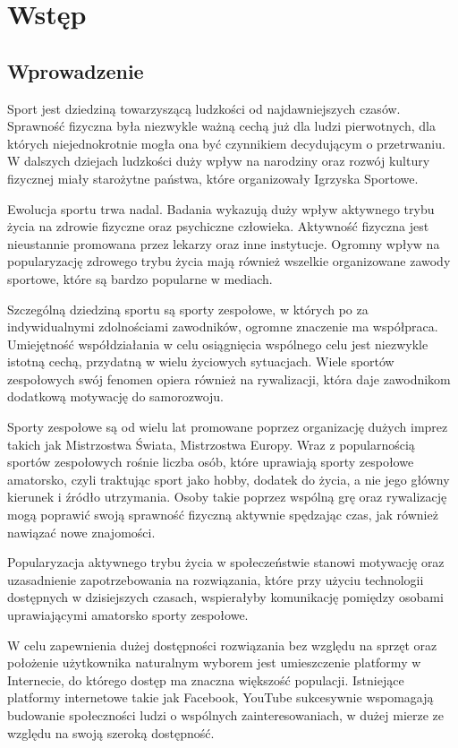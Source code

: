 \chapter{Wstęp}
\section{Wprowadzenie}

Sport jest dziedziną towarzyszącą ludzkości od najdawniejszych czasów. Sprawność fizyczna była niezwykle ważną cechą już dla ludzi pierwotnych, dla których niejednokrotnie mogła ona być czynnikiem decydującym o przetrwaniu. W dalszych dziejach ludzkości duży wpływ na narodziny oraz rozwój kultury fizycznej miały starożytne państwa, które organizowały Igrzyska Sportowe.

Ewolucja sportu trwa nadal. Badania wykazują duży wpływ aktywnego trybu życia na zdrowie fizyczne oraz psychiczne człowieka. Aktywność fizyczna jest nieustannie promowana przez lekarzy oraz inne instytucje. Ogromny wpływ na popularyzację zdrowego trybu życia mają również wszelkie organizowane zawody sportowe, które są bardzo popularne w mediach.

Szczególną dziedziną sportu są sporty zespołowe, w których po za indywidualnymi zdolnościami zawodników, ogromne znaczenie ma współpraca. Umiejętność współdziałania w celu osiągnięcia wspólnego celu jest niezwykle istotną cechą, przydatną w wielu życiowych sytuacjach. Wiele sportów zespołowych swój fenomen opiera również na rywalizacji, która daje zawodnikom dodatkową motywację do samorozwoju. 

Sporty zespołowe są od wielu lat promowane poprzez organizację dużych imprez takich jak Mistrzostwa Świata, Mistrzostwa Europy. Wraz z popularnością sportów zespołowych rośnie liczba osób, które uprawiają sporty zespołowe amatorsko, czyli traktując sport jako hobby, dodatek do życia, a nie jego główny kierunek i źródło utrzymania. Osoby takie poprzez wspólną grę oraz rywalizację mogą poprawić swoją sprawność fizyczną aktywnie spędzając czas, jak również nawiązać nowe znajomości.

Popularyzacja aktywnego trybu życia w społeczeństwie stanowi motywację oraz uzasadnienie zapotrzebowania na rozwiązania, które przy użyciu technologii dostępnych w dzisiejszych czasach, wspierałyby komunikację pomiędzy osobami uprawiającymi amatorsko sporty zespołowe. 

W celu zapewnienia dużej dostępności rozwiązania bez względu na sprzęt oraz położenie użytkownika naturalnym wyborem jest umieszczenie platformy w Internecie, do którego dostęp ma znaczna większość populacji. Istniejące platformy internetowe takie jak Facebook, YouTube sukcesywnie wspomagają budowanie społeczności ludzi o wspólnych zainteresowaniach, w dużej mierze ze względu na swoją szeroką dostępność.

